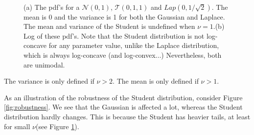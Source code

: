 \documentclass[graybox, envcountchap, twocolumn]{styles/svmult}
\begin{document}
\begin{figure}[hbtp]
\centering
{} \\
\caption{(a) The pdf’s for a $\mathcal{N}(0,1)$, $\mathcal{T}(0,1,1)$ and $Lap(0,1/\sqrt{2})$. The mean is 0 and the variance is 1 for both the Gaussian and Laplace. The mean and variance of the Student is undefined when $\nu=1$.(b) Log of these pdf’s. Note that the Student distribution is not log-concave for any parameter value, unlike the Laplace distribution, which is always log-concave (and log-convex...) Nevertheless, both are unimodal.}
\label{fig:pdfs-for-NTL} 
\end{figure}

The variance is only defined if $\nu>2$. The mean is only defined if $\nu>1$.

As an illustration of the robustness of the Student distribution, consider Figure \ref{fig:robustness}. We see that the Gaussian is affected a lot, whereas the Student distribution hardly changes. This is because the Student has heavier tails, at least for small $\nu$(see Figure \ref{fig:pdfs-for-NTL}).
\end{document}
